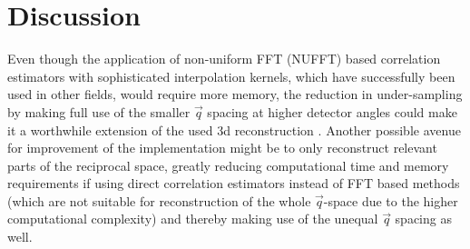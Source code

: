 \chapter{Discussion}
Even though the application of non-uniform FFT (NUFFT) based correlation estimators with sophisticated interpolation kernels, which have  successfully been used in other fields, would require more memory, the reduction in under-sampling by making full use of the smaller $\vec{q}$ spacing at higher detector angles could make it a worthwhile extension of the used 3d reconstruction \cite{laguna1998,yang2008,chang2020}. Another possible avenue for improvement of the implementation might be to only reconstruct relevant parts of the reciprocal space, greatly reducing computational time and memory requirements if using direct correlation estimators instead of FFT based methods (which are not suitable for reconstruction of the whole $\vec{q}$-space due to the higher computational complexity) and thereby making use of the unequal $\vec{q}$ spacing as well.